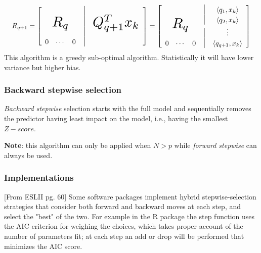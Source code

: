 \documentclass[12pt, letterpaper]{article}
\theoremstyle{definition}
\begin{document}
\begin{equation}
  R_{q+1} = 
  \left[ \begin{array}{ *{5}{c} }
    & & &\text{\Large{$|$}}  &\\
    & &&\text{\Large{$|$}} &  \\
    \multicolumn{3}{c}
      {\raisebox{\dimexpr\normalbaselineskip+.3\ht\strutbox-.3\height}[0pt][0pt]
        {\scalebox{2}{$R_q$}}} &\text{\Large{$|$}}& {\raisebox{\dimexpr\normalbaselineskip+.2\ht\strutbox-.2\height}[0pt][0pt]
        {\scalebox{2}{$Q_{q+1}^Tx_k$}}}\\
    0 & \cdots & 0&\text{\Large{$|$}} &
  \end{array} \right] =   \left[ \begin{array}{ *{5}{c} }
    & & &\text{\Large{$|$}}  & \langle{q_1, x_k\rangle}\\
    & &&\text{\Large{$|$}}  & \langle{q_2, x_k\rangle}\\
    \multicolumn{3}{c}
      {\raisebox{\dimexpr\normalbaselineskip+.3\ht\strutbox-.3\height}[0pt][0pt]
        {\scalebox{2}{$R_q$}}} &\text{\Large{$|$}}&\vdots\\
    0 & \cdots & 0&\text{\Large{$|$}} &\langle{q_{q+1}, x_k\rangle}
  \end{array} \right]
\end{equation}
This algorithm is a greedy sub-optimal algorithm. Statistically it will have lower variance but higher bias.

\subsubsection{Backward stepwise selection}
\textit{Backward stepwise} selection starts with the full model and sequentially removes the predictor having least impact on the model, i.e., having the smallest $Z-score$.

\textbf{Note}: this algorithm can only be applied when $N>p$ while \textit{forward stepwise} can always be used.

\subsubsection{Implementations}
[From ESLII pg. 60]
Some software packages implement hybrid stepwise-selection strategies that consider both forward and backward moves at each step, and select the "best" of the two. For example in the R package the step function uses the AIC criterion for weighing the choices, which takes proper account of the number of parameters fit; at each step an add or drop will be performed that minimizes the AIC score.
\end{document}
